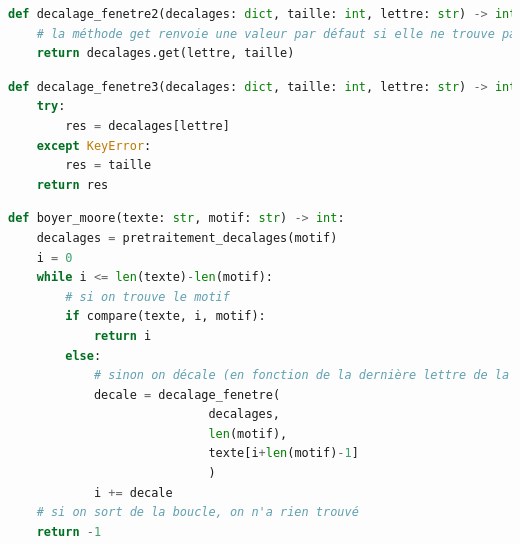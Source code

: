 \documentclass[svgnames,11pt]{beamer}
\begin{document}
\begin{frame}[fragile]

\begin{center}
\begin{lstlisting}[language=Python , basicstyle=\ttfamily\small, xleftmargin=0.2em, xrightmargin=0em]
def decalage_fenetre2(decalages: dict, taille: int, lettre: str) -> int:
    # la méthode get renvoie une valeur par défaut si elle ne trouve pas la clé
    return decalages.get(lettre, taille)
\end{lstlisting}
\begin{lstlisting}[language=Python , basicstyle=\ttfamily\small, xleftmargin=0.2em, xrightmargin=0em]
def decalage_fenetre3(decalages: dict, taille: int, lettre: str) -> int:
    try:
        res = decalages[lettre]
    except KeyError:
        res = taille
    return res
\end{lstlisting}
\label{CODE}
\end{center}

\end{frame}
\begin{frame}[fragile]
\begin{center}
\begin{lstlisting}[language=Python , basicstyle=\ttfamily\small, xleftmargin=0.2em, xrightmargin=0em]
def boyer_moore(texte: str, motif: str) -> int:
    decalages = pretraitement_decalages(motif)
    i = 0
    while i <= len(texte)-len(motif):
        # si on trouve le motif
        if compare(texte, i, motif):
            return i
        else:
            # sinon on décale (en fonction de la dernière lettre de la fenêtre)
            decale = decalage_fenetre(
                            decalages, 
                            len(motif), 
                            texte[i+len(motif)-1]
                            )
            i += decale
    # si on sort de la boucle, on n'a rien trouvé
    return -1
\end{lstlisting}
\end{center}

\end{frame}
\end{document}
